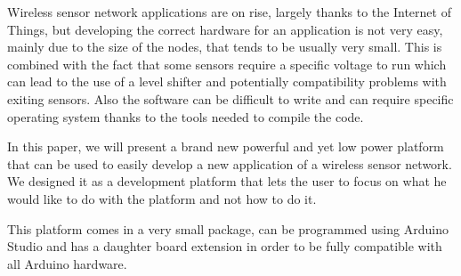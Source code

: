 Wireless sensor network applications are on rise, largely thanks to the Internet of Things, but
developing the correct hardware for an application is not very easy, mainly due to the size of the
nodes, that tends to be usually very small. This is combined with the fact that some sensors
require a specific voltage to run which can lead to the use of a level shifter and potentially
compatibility problems with exiting sensors. Also the software can be difficult to write and can
require specific operating system thanks to the tools needed to compile the code.

In this paper, we will present a brand new powerful and yet low power platform that can be used to easily develop a new application of a wireless sensor network. We designed it as a development platform that lets the user to focus on what he would like to do with the platform and not how to do it.

This platform comes in a very small package, can be programmed using Arduino Studio and has a daughter board extension in order to be fully compatible with all Arduino hardware.
